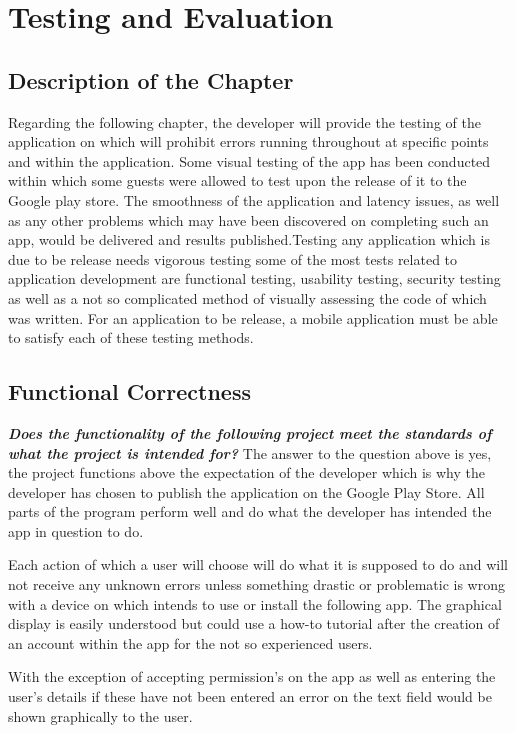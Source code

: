 \chapter{Testing and Evaluation}

\section{Description of the Chapter}
Regarding the following chapter, the developer will provide the testing of the application on which will prohibit errors running throughout at specific points and within the application. Some visual testing of the app has been conducted within which some guests were allowed to test upon the release of it to the Google play store. The smoothness of the application and latency issues, as well as any other problems which may have been discovered on completing such an app, would be delivered and results published.Testing any application which is due to be release needs vigorous testing some of the most tests related to application development are functional testing, usability testing, security testing as well as a not so complicated method of visually assessing the code of which was written. For an application to be release, a mobile application must be able to satisfy each of these testing methods.
\section{Functional Correctness}
\textbf{\textit{Does the functionality of the following project meet the standards of what the project is intended for?}}
\newline
The answer to the question above is yes, the project functions above the expectation of the developer which is why the developer has chosen to publish the application on the Google Play Store. All parts of the program perform well and do what the developer has intended the app in question to do. 
\par
Each action of which a user will choose will do what it is supposed to do and will not receive any unknown errors unless something drastic or problematic is wrong with a device on which intends to use or install the following app. The graphical display is easily understood but could use a how-to tutorial after the creation of an account within the app for the not so experienced users.
\par
With the exception of accepting permission's on the app as well as entering the user's details if these have not been entered an error on the text field would be shown graphically to the user.

